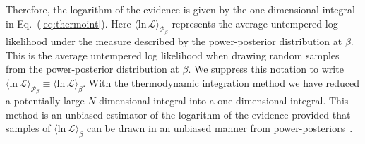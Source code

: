 Therefore, the logarithm of the evidence is given by the one dimensional integral in Eq.~(\ref{eq:thermoint}).
Here $\langle \mathrm{ln} \, \mathcal{L} \rangle_{\mathcal{P}_\beta}$ represents the average untempered log-likelihood under the measure described by the power-posterior distribution at $\beta$. This is the average untempered log likelihood when drawing random samples from the power-posterior distribution at $\beta$. We suppress this notation to write $\langle \mathrm{ln} \, \mathcal{L} \rangle_{\mathcal{P}_\beta} \equiv \langle \mathrm{ln} \, \mathcal{L} \rangle_\beta$. With the thermodynamic integration method we have reduced a potentially large $N$ dimensional integral into a one dimensional integral. This method is an unbiased estimator of the logarithm of the evidence provided that samples of $\langle \mathrm{ln} \, \mathcal{L} \rangle_\beta$ can be drawn in an unbiased manner from power-posteriors~\citep{carlson2016partition}.

